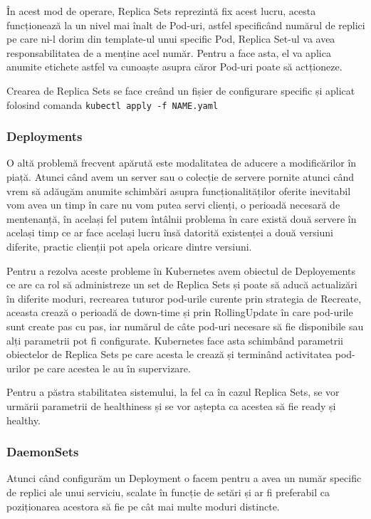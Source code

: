 În acest mod de operare, Replica Sets reprezintă fix acest lucru, acesta funcționează 
la un nivel mai înalt de Pod-uri, astfel specificând numărul de replici pe care ni-l dorim
din template-ul unui specific Pod, Replica Set-ul va avea responsabilitatea de a menține
acel număr. Pentru a face asta, el va aplica anumite etichete astfel va cunoaște 
asupra căror Pod-uri poate să actționeze.

Crearea de Replica Sets se face creând un fișier de configurare specific și aplicat folosind
comanda \verb|kubectl apply -f NAME.yaml|

\subsubsection{Deployments}

O altă problemă frecvent apărută este modalitatea de aducere a modificărilor în piață.
Atunci când avem un server sau o colecție de servere pornite atunci când vrem 
să adăugăm anumite schimbări asupra funcționalităților oferite inevitabil vom avea
un timp în care nu vom putea servi clienți, o perioadă necesară de mentenanță, în 
același fel putem întâlnii problema în care există două servere în același timp ce
ar face același lucru însă datorită existenței a două versiuni diferite, practic
clienții pot apela oricare dintre versiuni.

Pentru a rezolva aceste probleme în Kubernetes avem obiectul de Deployements
ce are ca rol să administreze un set de Replica Sets și poate să aducă actualizări 
în diferite moduri, recrearea tuturor pod-urile curente prin strategia de Recreate,
aceasta crează o perioadă de down-time și prin RollingUpdate în care pod-urile sunt
create pas cu pas, iar numărul de câte pod-uri necesare să fie disponibile sau alți 
parametrii pot fi configurate. Kubernetes face asta schimbând parametrii obiectelor
de Replica Sets pe care acesta le crează și terminând activitatea pod-urilor pe care 
acestea le au în supervizare.

Pentru a păstra stabilitatea sistemului, la fel ca în cazul Replica Sets, se vor
urmării parametrii de healthiness și se vor aștepta ca acestea să fie ready și 
healthy.

\subsubsection{DaemonSets}

Atunci când configurăm un Deployment o facem pentru a avea un număr specific de 
replici ale unui serviciu, scalate în funcție de setări și ar fi preferabil 
ca poziționarea acestora să fie pe cât mai multe moduri distincte.

